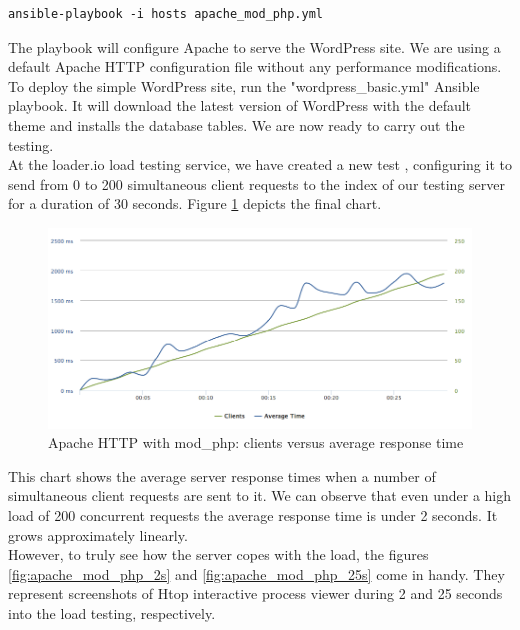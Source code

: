 \begin{lstlisting}
ansible-playbook -i hosts apache_mod_php.yml
\end{lstlisting}

The playbook will configure Apache to serve the WordPress site. We are using a default Apache HTTP configuration file without any performance modifications. \cite{WP_Ansible:apache.conf}\\

To deploy the simple WordPress site, run the "wordpress\_basic.yml" Ansible playbook. It will download the latest version of WordPress with the default theme and installs the database tables. We are now ready to carry out the testing. \\

At the loader.io load testing service, we have created a new test \cite{Loader.io:apache_mod_php}, configuring it to send from 0 to 200 simultaneous client requests to the index of our testing server for a duration of 30 seconds. Figure \ref{fig:apache_mod_php} depicts the final chart.


\begin{figure}[H]
\begin{center}
\includegraphics[scale=0.5]{figures/Apache_mod_php.png}
\caption{Apache HTTP with mod\_php: clients versus average response time}
\label{fig:apache_mod_php}
\end{center}
\end{figure}

This chart shows the average server response times when a number of simultaneous client requests are sent to it. We can observe that even under a high load of 200 concurrent requests the average response time is under 2 seconds. It grows approximately linearly. \\

However, to truly see how the server copes with the load, the figures \ref{fig:apache_mod_php_2s} and \ref{fig:apache_mod_php_25s} come in handy. They represent screenshots of Htop interactive process viewer \cite{Htop:main_site} during 2 and 25 seconds into the load testing, respectively.

